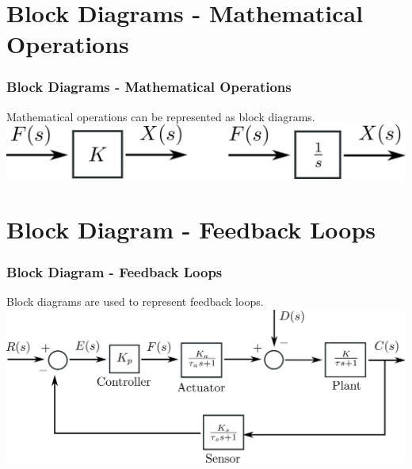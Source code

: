 \documentclass{beamer}                  %
\newcommand{\sectiontitleIV}{Block Diagrams - Mathematical Operations}
\newcommand{\sectiontitleV}{Block Diagram - Feedback Loops}
\begin{document}
	\begin{frame} \small
	

	\end{frame}	



\section{\sectiontitleIV}

	\begin{frame}[label=sectionIV] \small
		\frametitle{\sectiontitleIV}
		

		Mathematical operations can be represented as block diagrams. \vspace{2mm}\\

		\includegraphics[scale=.04]{two_types_blocks.png}
	\end{frame}	

\section{\sectiontitleV}

	\begin{frame}[label=sectionV] \small
		\frametitle{\sectiontitleV}

		Block diagrams are used to represent feedback loops. \vspace{5mm} \\
		
		\includegraphics[scale=0.04]{control_loop_example.png}
	\end{frame}	
\end{document}
